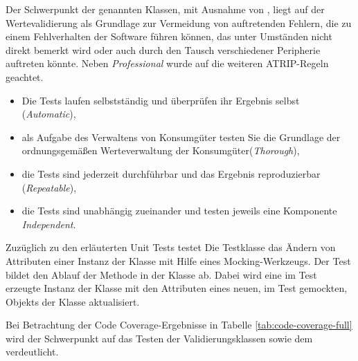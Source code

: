 Der Schwerpunkt der genannten Klassen, mit Ausnahme von , liegt auf der Wertevalidierung als Grundlage zur Vermeidung von auftretenden Fehlern, die zu einem Fehlverhalten der Software führen können, das unter Umständen nicht direkt bemerkt wird oder auch durch den Tausch verschiedener Peripherie auftreten könnte.
Neben \textit{Professional} wurde auf die weiteren ATRIP-Regeln geachtet.
\begin{itemize}
    \item Die Tests laufen selbstständig und überprüfen ihr Ergebnis selbst (\textit{Automatic}),
    \item als Aufgabe des Verwaltens von Konsumgüter testen Sie die Grundlage der ordnungsgemäßen Werteverwaltung der Konsumgüter(\textit{Thorough}),
    \item die Tests sind jederzeit durchführbar und das Ergebnis reproduzierbar (\textit{Repeatable}),
    \item die Tests sind unabhängig zueinander und testen jeweils eine Komponente \textit{Independent}.
\end{itemize}

Zuzüglich zu den erläuterten Unit Tests testet Die Testklasse  das Ändern von Attributen einer Instanz der Klasse  mit Hilfe eines Mocking-Werkzeugs.
Der Test bildet den Ablauf der Methode  in der Klasse  ab.
Dabei wird eine im Test erzeugte Instanz der Klasse  mit den Attributen eines neuen, im Test gemockten, Objekts der Klasse  aktualisiert.



Bei Betrachtung der Code Coverage-Ergebnisse in Tabelle \ref{tab:code-coverage-full} wird der Schwerpunkt auf das Testen der Validierungsklassen sowie dem  verdeutlicht.

